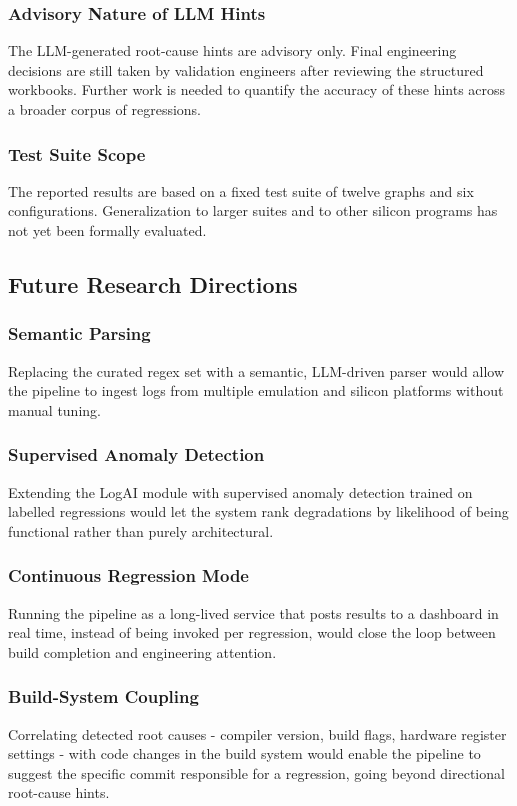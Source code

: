 \documentclass[conference]{IEEEtran}
\begin{document}
\subsubsection{Advisory Nature of LLM Hints}
The LLM-generated root-cause hints are advisory only. Final engineering decisions are still taken by validation engineers after reviewing the structured workbooks. Further work is needed to quantify the accuracy of these hints across a broader corpus of regressions.

\subsubsection{Test Suite Scope}
The reported results are based on a fixed test suite of twelve graphs and six configurations. Generalization to larger suites and to other silicon programs has not yet been formally evaluated.

\subsection{Future Research Directions}
\subsubsection{Semantic Parsing}
Replacing the curated regex set with a semantic, LLM-driven parser \cite{le2023logprompt, zhang2025semanticlog} would allow the pipeline to ingest logs from multiple emulation and silicon platforms without manual tuning.

\subsubsection{Supervised Anomaly Detection}
Extending the LogAI module with supervised anomaly detection trained on labelled regressions would let the system rank degradations by likelihood of being functional rather than purely architectural.

\subsubsection{Continuous Regression Mode}
Running the pipeline as a long-lived service that posts results to a dashboard in real time, instead of being invoked per regression, would close the loop between build completion and engineering attention.

\subsubsection{Build-System Coupling}
Correlating detected root causes - compiler version, build flags, hardware register settings - with code changes in the build system would enable the pipeline to suggest the specific commit responsible for a regression, going beyond directional root-cause hints.
\end{document}
